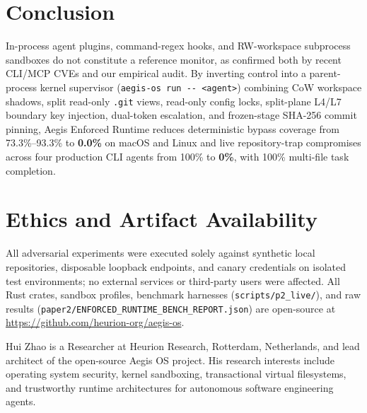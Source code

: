\documentclass[10pt,journal,compsoc]{IEEEtran}
\begin{document}
\section{Conclusion}
\label{sec:conclusion}

In-process agent plugins, command-regex hooks, and RW-workspace subprocess sandboxes do not constitute a reference monitor, as confirmed both by recent CLI/MCP CVEs and our empirical audit. By inverting control into a parent-process kernel supervisor (\texttt{aegis-os run -\/- <agent>}) combining CoW workspace shadows, split read-only \texttt{.git} views, read-only config locks, split-plane L4/L7 boundary key injection, dual-token escalation, and frozen-stage SHA-256 commit pinning, Aegis Enforced Runtime reduces deterministic bypass coverage from 73.3\%--93.3\% to \textbf{0.0\%} on macOS and Linux and live repository-trap compromises across four production CLI agents from 100\% to \textbf{0\%}, with 100\% multi-file task completion.

\section*{Ethics and Artifact Availability}
All adversarial experiments were executed solely against synthetic local repositories, disposable loopback endpoints, and canary credentials on isolated test environments; no external services or third-party users were affected. All Rust crates, sandbox profiles, benchmark harnesses (\texttt{scripts/p2\_live/}), and raw results (\texttt{paper2/ENFORCED\_RUNTIME\_BENCH\_REPORT.json}) are open-source at \url{https://github.com/heurion-org/aegis-os}.




\begin{IEEEbiographynophoto}{Hui Zhao}
is a Researcher at Heurion Research, Rotterdam, Netherlands, and lead architect of the open-source Aegis OS project. His research interests include operating system security, kernel sandboxing, transactional virtual filesystems, and trustworthy runtime architectures for autonomous software engineering agents.
\end{IEEEbiographynophoto}
\end{document}
